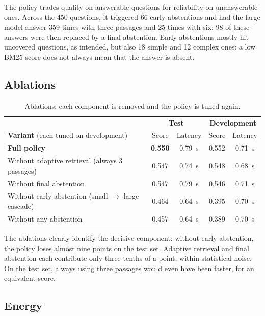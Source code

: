 \documentclass[11pt,a4paper]{article}
\begin{document}
The policy trades quality on answerable questions for reliability on unanswerable ones. Across the 450
questions, it triggered 66 early abstentions and had the large model answer 359 times with three
passages and 25 times with six; 98 of these answers were then replaced by a final abstention. Early
abstentions mostly hit uncovered questions, as intended, but also 18 simple and 12 complex ones: a low
BM25 score does not always mean that the answer is absent.

\subsection{Ablations}

\begin{table}[H]
\centering\small
\begin{tabular}{l c c c c}
\toprule
& \multicolumn{2}{c}{\textbf{Test}} & \multicolumn{2}{c}{\textbf{Development}} \\
\textbf{Variant} (each tuned on development) & Score & Latency & Score & Latency \\
\midrule
\textbf{Full policy} & \textbf{0.550} & 0.79~s & 0.552 & 0.71~s \\
Without adaptive retrieval (always 3 passages) & 0.547 & 0.74~s & 0.548 & 0.68~s \\
Without final abstention & 0.547 & 0.79~s & 0.546 & 0.71~s \\
Without early abstention (small $\to$ large cascade) & 0.464 & 0.64~s & 0.395 & 0.70~s \\
Without any abstention & 0.457 & 0.64~s & 0.389 & 0.70~s \\
\bottomrule
\end{tabular}
\caption{Ablations: each component is removed and the policy is tuned again.}
\label{tab:ablations}
\end{table}

The ablations clearly identify the decisive component: without early abstention, the policy loses almost
nine points on the test set. Adaptive retrieval and final abstention each contribute only three tenths
of a point, within statistical noise. On the test set, always using three passages would even have been
faster, for an equivalent score.

\subsection{Energy}
\end{document}
